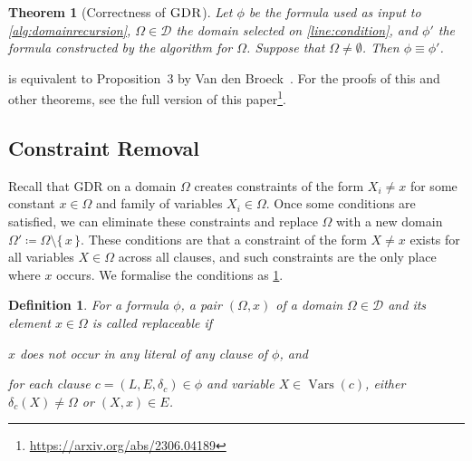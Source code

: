 \documentclass{article}
\newtheorem{theorem}{Theorem}
\newtheorem{definition}{Definition}
\DeclareMathOperator{\GDR}{\textsc{GDR}}
\DeclareMathOperator{\Vars}{Vars}
\begin{document}
\begin{theorem}[Correctness of $\GDR$]\label{thm:correctness1}
  Let $\phi$ be the formula used as input to \cref{alg:domainrecursion},
  $\Omega \in \mathcal{D}$ the domain selected on \cref{line:condition}, and
  $\phi'$ the formula constructed by the algorithm for $\Omega$. Suppose that
  $\Omega \ne \emptyset$. Then $\phi \equiv \phi'$.
\end{theorem}

 is equivalent to Proposition~3 by Van den
Broeck~. For the proofs of this and other
theorems, see the full version of this
paper\footnote{\url{https://arxiv.org/abs/2306.04189}}.

\subsection{Constraint Removal}\label{sec:cr}

Recall that GDR on a domain $\Omega$ creates constraints of the form $X_i \ne x$
for some constant $x \in \Omega$ and family of variables $X_i \in \Omega$. Once
some conditions are satisfied, we can eliminate these constraints and replace
$\Omega$ with a new domain $\Omega' \coloneqq \Omega \setminus \{\, x \,\}$.
These conditions are that a constraint of the form $X \ne x$ exists for all
variables $X \in \Omega$ across all clauses, and such constraints are the only
place where $x$ occurs. We formalise the conditions as \cref{def:replaceable}.

\begin{definition}\label{def:replaceable}
  For a formula $\phi$, a pair $(\Omega, x)$ of a domain
  $\Omega \in \mathcal{D}$ and its element $x \in \Omega$ is called
  \emph{replaceable} if
  \begin{enumerate*}[label=(\roman*)]
    \item $x$ does not occur in any literal of any clause of $\phi$, and
    \item for each clause $c = (L, E, \delta_c) \in \phi$ and variable
    $X \in \Vars(c)$, either $\delta_c(X) \ne \Omega$ or $(X, x) \in E$.
  \end{enumerate*}
\end{definition}
\end{document}

